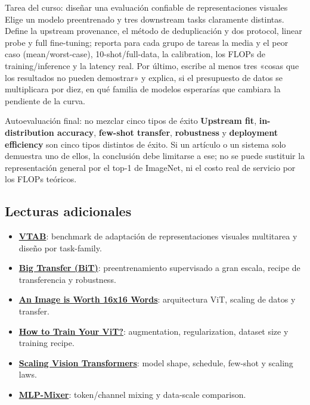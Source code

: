 \begin{importantbox}{Tarea del curso: diseñar una evaluación confiable de representaciones visuales}
Elige un modelo preentrenado y tres downstream tasks claramente distintas. Define la upstream provenance, el método de deduplicación y dos protocol, linear probe y full fine-tuning; reporta para cada grupo de tareas la media y el peor caso (mean/worst-case), 10-shot/full-data, la calibration, los FLOPs de training/inference y la latency real. Por último, escribe al menos tres «cosas que los resultados no pueden demostrar» y explica, si el presupuesto de datos se multiplicara por diez, en qué familia de modelos esperarías que cambiara la pendiente de la curva.
\end{importantbox}

\begin{warningbox}{Autoevaluación final: no mezclar cinco tipos de éxito}
\textbf{Upstream fit}, \textbf{in-distribution accuracy}, \textbf{few-shot transfer}, \textbf{robustness} y \textbf{deployment efficiency} son cinco tipos distintos de éxito. Si un artículo o un sistema solo demuestra uno de ellos, la conclusión debe limitarse a ese; no se puede sustituir la representación general por el top-1 de ImageNet, ni el costo real de servicio por los FLOPs teóricos.
\end{warningbox}

\subsection{Lecturas adicionales}

{\small
\begin{itemize}[nosep,leftmargin=*]
  \item \href{https://arxiv.org/abs/1910.04867}{\textbf{VTAB}}: benchmark de adaptación de representaciones visuales multitarea y diseño por task-family.
  \item \href{https://arxiv.org/abs/1912.11370}{\textbf{Big Transfer (BiT)}}: preentrenamiento supervisado a gran escala, recipe de transferencia y robustness.
  \item \href{https://arxiv.org/abs/2010.11929}{\textbf{An Image is Worth 16x16 Words}}: arquitectura ViT, scaling de datos y transfer.
  \item \href{https://arxiv.org/abs/2106.10270}{\textbf{How to Train Your ViT?}}: augmentation, regularization, dataset size y training recipe.
  \item \href{https://arxiv.org/abs/2106.04560}{\textbf{Scaling Vision Transformers}}: model shape, schedule, few-shot y scaling laws.
  \item \href{https://arxiv.org/abs/2105.01601}{\textbf{MLP-Mixer}}: token/channel mixing y data-scale comparison.
\end{itemize}
}


